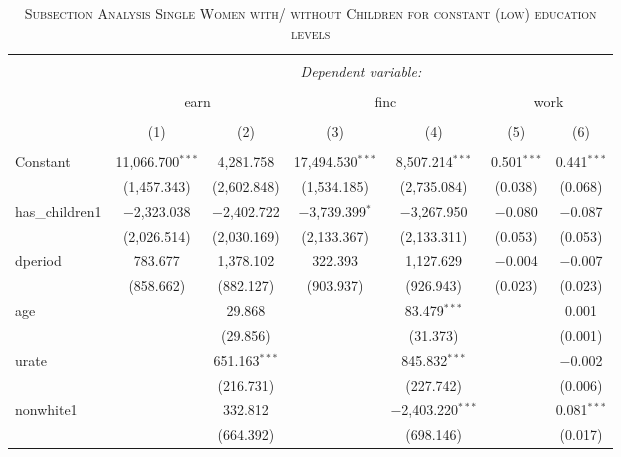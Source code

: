 \documentclass[a4paper]{article}
\begin{document}
\begin{table}[!htbp] \centering 
\begin{adjustwidth}{0.cm}{-0cm}
\begin{threeparttable}
\small
\captionsetup{font=small, justification=raggedright,singlelinecheck=false}
\caption{\textsc{Subsection Analysis Single Women with/ without Children for constant (low) education levels}}
\centering 
  \label{}
\small 
\begin{tabular}{@{\extracolsep{-2pt}}lcccccc} 
\\[-5.8ex]\hline 
\hline \\[-1.8ex] 
 & \multicolumn{6}{c}{\textit{Dependent variable:}} \\ 
\cline{2-7} 
\\[-1.8ex] & \multicolumn{2}{c}{earn} & \multicolumn{2}{c}{finc} & \multicolumn{2}{c}{work} \\ 
\\[-1.8ex] & (1) & (2) & (3) & (4) & (5) & (6)\\ 
\hline \\[-1.8ex] 
 Constant & 11,066.700$^{***}$ & 4,281.758 & 17,494.530$^{***}$ & 8,507.214$^{***}$ & 0.501$^{***}$ & 0.441$^{***}$ \\ 
  & (1,457.343) & (2,602.848) & (1,534.185) & (2,735.084) & (0.038) & (0.068) \\ 
  has\_children1 & $-$2,323.038 & $-$2,402.722 & $-$3,739.399$^{*}$ & $-$3,267.950 & $-$0.080 & $-$0.087 \\ 
  & (2,026.514) & (2,030.169) & (2,133.367) & (2,133.311) & (0.053) & (0.053) \\ 
  dperiod & 783.677 & 1,378.102 & 322.393 & 1,127.629 & $-$0.004 & $-$0.007 \\ 
  & (858.662) & (882.127) & (903.937) & (926.943) & (0.023) & (0.023) \\ 
  age &  & 29.868 &  & 83.479$^{***}$ &  & 0.001 \\ 
  &  & (29.856) &  & (31.373) &  & (0.001) \\ 
  urate &  & 651.163$^{***}$ &  & 845.832$^{***}$ &  & $-$0.002 \\ 
  &  & (216.731) &  & (227.742) &  & (0.006) \\ 
  nonwhite1 &  & 332.812 &  & $-$2,403.220$^{***}$ &  & 0.081$^{***}$ \\ 
  &  & (664.392) &  & (698.146) &  & (0.017) \\ 

\end{tabular}
\end{threeparttable}
\end{adjustwidth}
\end{table}
\end{document}
